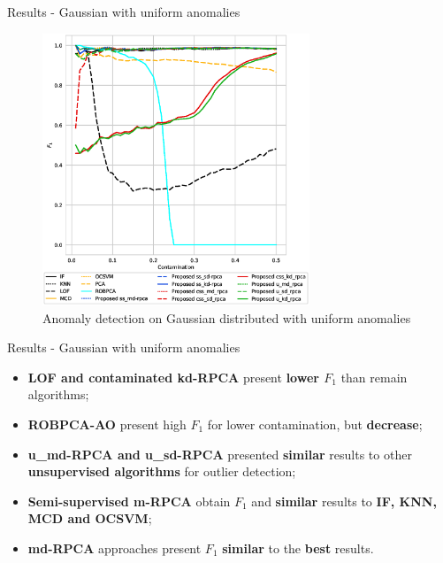\documentclass[newPxFont, numfooter, sectionpages]{beamer}
\begin{document}
\begin{frame}[c]{Results - Gaussian with uniform anomalies}
    \begin{figure}[h!]
    	\centering
    	\includegraphics[width=8cm]{figures/ch4/gaussian_f1_contamination.eps}
    	\caption{Anomaly detection on Gaussian distributed with uniform anomalies}
    	\label{fig:4.10}
    \end{figure}
\end{frame}

\begin{frame}[c]{Results - Gaussian with uniform anomalies}
	\begin{itemize}
		\item \textbf{LOF and contaminated kd-RPCA} present \textbf{lower $F_1$} than remain algorithms;
		\item \textbf{ROBPCA-AO} present high $F_1$ for lower contamination, but \textbf{decrease};
		\item \textbf{u\_md-RPCA and u\_sd-RPCA} presented \textbf{similar} results to other \textbf{unsupervised algorithms} for outlier detection;
		\item \textbf{Semi-supervised m-RPCA} obtain $F_1$ and \textbf{similar} results to \textbf{IF, KNN, MCD and OCSVM};
		\item \textbf{md-RPCA} approaches present $F_1$ \textbf{similar} to the \textbf{best} results.
	\end{itemize}
\end{frame}
\end{document}
